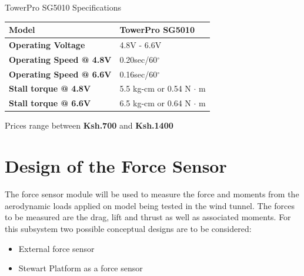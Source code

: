 \begin{table}[!h]
\caption[Motor Specifications]{TowerPro SG5010 Specifications}
\end{table}
\begin{center}
\begin{tabular}{|l|l|}
\hline
\textbf{Model}& TowerPro SG5010\\
\hline
\textbf{Operating Voltage} & 4.8V - 6.6V\\
\hline
\textbf{Operating Speed @ 4.8V} & 0.20sec/60$^{\circ}$\\
\hline
\textbf{Operating Speed @ 6.6V}& 0.16sec/60$^{\circ}$\\
\hline
\textbf{Stall torque @ 4.8V} & 5.5 kg-cm or 0.54 N $\cdot$ m\\
\hline
\textbf{Stall torque @ 6.6V} & 6.5 kg-cm or 0.64 N $\cdot$ m\\
\hline
\end{tabular}
\end{center}
Prices range between \textbf{Ksh.700} and \textbf{Ksh.1400}

\section{Design of the Force Sensor}
The force sensor module will be used to measure the force and moments from the aerodynamic loads applied on model being tested in the wind tunnel. The forces to be measured are the drag, lift and thrust as well as associated moments. For this subsystem two possible conceptual designs are to be considered:
\begin{itemize}
\item External force sensor
\item Stewart Platform as a force sensor
\end{itemize}
